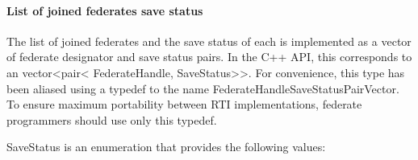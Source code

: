 \begin{compactstdpage}

    \paragraph{List of joined federates save status}

    The list of joined federates and the save status of each is implemented as a vector of federate designator and save status pairs. In the C++ API, this corresponds to an vector\textless{}pair\textless{} FederateHandle, SaveStatus\textgreater{}\textgreater{}. For convenience, this type has been aliased using a typedef to the name FederateHandleSaveStatusPairVector. To ensure maximum portability between RTI implementations, federate programmers should use only this typedef.

    SaveStatus is an enumeration that provides the following values:

\end{compactstdpage}

\clearpage

